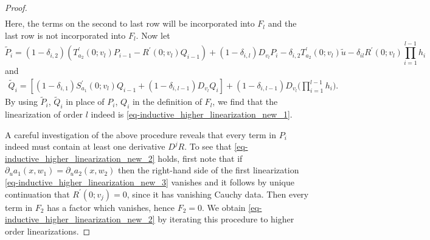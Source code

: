 \documentclass[11pt,a4paper]{amsart}
\theoremstyle{definition}
\numberwithin{equation}{section}
\begin{document}
\begin{proof}
\begin{equation*}
\begin{aligned}
\end{aligned}
\end{equation*}
Here, the terms on the second to last row will be incorporated into \( F_{l} \) and the last row is not incorporated into \( F_{l} \).
Now let
\begin{equation*}
	\tilde{P}_{i} = (1-\delta_{i,2})(T_{a_{2}}^{\prime}(0;v_{l})P_{i-1} - R^{\prime}(0;v_{l})Q_{i-1}) + (1-\delta_{i,l})D_{v_{l}}P_{i} - \delta_{i,2}T_{a_{2}}^{\prime}(0;v_{l})\tilde{u}-\delta_{il}R^{\prime}(0;v_{l})\prod_{i=1}^{l-1}h_{i}
\end{equation*}
and
\begin{equation*}
\begin{aligned}
	\tilde{Q}_{i} = [(1-\delta_{i,1})S_{a_{1}}^{\prime}(0;v_{l})Q_{i-1} + (1-\delta_{i,l-1})D_{v_{l}}Q_{i}] + (1-\delta_{i,l-1})D_{v_{l}}\Big(\prod_{i=1}^{l-1}h_{i}\Big).
\end{aligned}
\end{equation*}
By using \( \tilde{P}_{i} \), \( \tilde{Q}_{i} \) in place of \( P_{i} \), \( Q_{i} \) in the definition of \( F_{l} \), we find that the linearization of order \( l \) indeed is \eqref{eq-inductive_higher_linearization_new_1}.

A careful investigation of the above procedure reveals that every term in \( P_{i} \) indeed must contain at least one derivative \( D^{j}R \).
To see that \eqref{eq-inductive_higher_linearization_new_2} holds, first note that if \( \partial_{u}a_{1}(x,w_{1}) = \partial_{u}a_{2}(x,w_{2}) \) then the right-hand side of the first linearization \eqref{eq-inductive_higher_linearization_new_3} vanishes and it follows by unique continuation that \( R^{\prime}(0;v_{j}) = 0 \), since it has vanishing Cauchy data.
Then every term in \( F_{2} \) has a factor which vanishes, hence \( F_{2} = 0 \).
We obtain \eqref{eq-inductive_higher_linearization_new_2} by iterating this procedure to higher order linearizations.
\end{proof}
\end{document}

